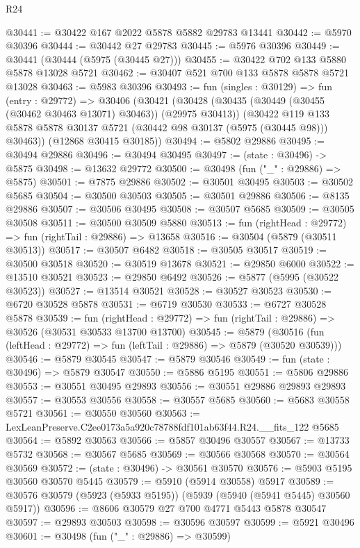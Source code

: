 \begin{lexlean}{R24}
\begin{coremodule}
@30441 := @30422 @167 @2022 @5878 @5882 @29783 @13441
@30442 := @5970 @30396
@30444 := @30442 @27 @29783
@30445 := @5976 @30396
@30449 := @30441 (@30444 (@5975 (@30445 @27)))
@30455 := @30422 @702 @133 @5880 @5878 @13028 @5721
@30462 := @30407 @521 @700 @133 @5878 @5878 @5721 @13028
@30463 := @5983 @30396
@30493 := fun (singles : @30129) =>
  fun (entry : @29772) =>
  @30406
    (@30421
      (@30428
        (@30435 (@30449 (@30455 (@30462 @30463 @13071) @30463)) (@29975 @30413))
        (@30422 @119 @133 @5878 @5878 @30137 @5721 (@30442 @98 @30137 (@5975 (@30445 @98))) @30463))
      (@12868 @30415 @30185))
@30494 := @5802 @29886
@30495 := @30494 @29886
@30496 := @30494 @30495
@30497 := (state : @30496) -> @5875
@30498 := @13632 @29772
@30500 := @30498 (fun ("_" : @29886) => @5875)
@30501 := @7875 @29886
@30502 := @30501 @30495
@30503 := @30502 @5685
@30504 := @30500 @30503
@30505 := @30501 @29886
@30506 := @8135 @29886
@30507 := @30506 @30495
@30508 := @30507 @5685
@30509 := @30505 @30508
@30511 := @30500 @30509 @5880
@30513 := fun (rightHead : @29772) => fun (rightTail : @29886) => @13658
@30516 := @30504 (@5879 (@30511 @30513))
@30517 := @30507 @6482
@30518 := @30505 @30517
@30519 := @30500 @30518
@30520 := @30519 @13678
@30521 := @29850 @6000
@30522 := @13510 @30521
@30523 := @29850 @6492
@30526 := @5877 (@5995 (@30522 @30523))
@30527 := @13514 @30521
@30528 := @30527 @30523
@30530 := @6720 @30528 @5878
@30531 := @6719 @30530
@30533 := @6727 @30528 @5878
@30539 := fun (rightHead : @29772) =>
  fun (rightTail : @29886) => @30526 (@30531 @30533 @13700 @13700)
@30545 := @5879
    (@30516 (fun (leftHead : @29772) => fun (leftTail : @29886) => @5879 (@30520 @30539)))
@30546 := @5879 @30545
@30547 := @5879 @30546
@30549 := fun (state : @30496) => @5879 @30547
@30550 := @5886 @5195
@30551 := @5806 @29886
@30553 := @30551 @30495 @29893
@30556 := @30551 @29886 @29893 @29893
@30557 := @30553 @30556
@30558 := @30557 @5685
@30560 := @5683 @30558 @5721
@30561 := @30550 @30560
@30563 := LexLeanPreserve.C2ee0173a5a920c78788fdf101ab63f44.R24.__fits_122 @5685
@30564 := @5892 @30563
@30566 := @5857 @30496 @30557
@30567 := @13733 @5732
@30568 := @30567 @5685
@30569 := @30566 @30568
@30570 := @30564 @30569
@30572 := (state : @30496) -> @30561 @30570
@30576 := @5903 @5195 @30560 @30570 @5445
@30579 := @5910 (@5914 @30558) @5917
@30589 := @30576 @30579 (@5923 (@5933 @5195)) (@5939 (@5940 (@5941 @5445) @30560 @5917))
@30596 := @8606 @30579 @27 @700 @4771 @5443 @5878 @30547
@30597 := @29893 @30503
@30598 := @30596 @30597
@30599 := @5921 @30496
@30601 := @30498 (fun ("_" : @29886) => @30599)

\end{coremodule}
\end{lexlean}
